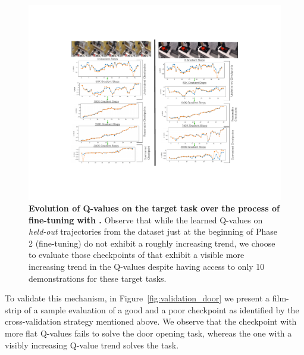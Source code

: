 \begin{figure}[h]
\centering
  \includegraphics[width=0.6\linewidth]{chapters/ptr/Fig_rebuttal.pdf}
  \vspace{-0.1cm}
  \caption{\footnotesize \textbf{Evolution of Q-values on the target task over the process of fine-tuning with \ptrmethodname.} Observe that while the learned Q-values on \emph{held-out} trajectories from the dataset just at the beginning of Phase 2 (fine-tuning) do not exhibit a roughly increasing trend, we choose to evaluate those checkpoints of \ptrmethodname that exhibit a visible more increasing trend in the Q-values despite having access to only 10 demonstrations for these target tasks.}
  \label{fig:moreexreb}
  \vspace{-0.1cm}
\end{figure}

To validate this mechanism, in Figure~\ref{fig:validation_door} we present a film-strip of a sample evaluation of a good and a poor checkpoint as identified by the cross-validation strategy mentioned above. We observe that the checkpoint with more flat Q-values fails to solve the door opening task, whereas the one with a visibly increasing Q-value trend solves the task.

